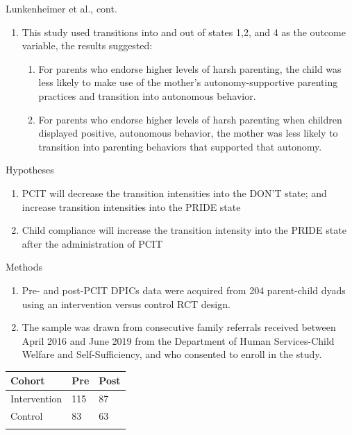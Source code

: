 \documentclass[
  ignorenonframetext,
]{beamer}
\providecommand{\tightlist}{%
  \setlength{\itemsep}{0pt}\setlength{\parskip}{0pt}}
\begin{document}
\begin{frame}{Lunkenheimer et al., cont.}
\label{lunkenheimer-et-al.-cont.}
\begin{enumerate}
\item
  This study used transitions into and out of states 1,2, and 4 as the
  outcome variable, the results suggested:

  \begin{enumerate}
  \item
    For parents who endorse higher levels of harsh parenting, the child
    was less likely to make use of the mother's autonomy-supportive
    parenting practices and transition into autonomous behavior.
  \item
    For parents who endorse higher levels of harsh parenting when
    children displayed positive, autonomous behavior, the mother was
    less likely to transition into parenting behaviors that supported
    that autonomy.
  \end{enumerate}
\end{enumerate}
\end{frame}

\begin{frame}{Hypotheses}
\label{hypotheses}
\begin{enumerate}
\tightlist
\item
  PCIT will decrease the transition intensities into the DON'T state;
  and increase transition intensities into the PRIDE state
\item
  Child compliance will increase the transition intensity into the PRIDE
  state after the administration of PCIT
\end{enumerate}
\end{frame}

\begin{frame}{Methods}
\label{methods-1}
\begin{enumerate}
\item
  Pre- and post-PCIT DPICs data were acquired from 204 parent-child
  dyads using an intervention versus control RCT design.
\item
  The sample was drawn from consecutive family referrals received
  between April 2016 and June 2019 from the Department of Human
  Services-Child Welfare and Self-Sufficiency, and who consented to
  enroll in the study.
\end{enumerate}

\begin{longtable}[]{@{}lll@{}}
\toprule\noalign{}
Cohort & Pre & Post \\
\midrule\noalign{}
\endhead
Intervention & 115 & 87 \\
Control & 83 & 63 \\
\bottomrule\noalign{}
\end{longtable}
\end{frame}
\end{document}
